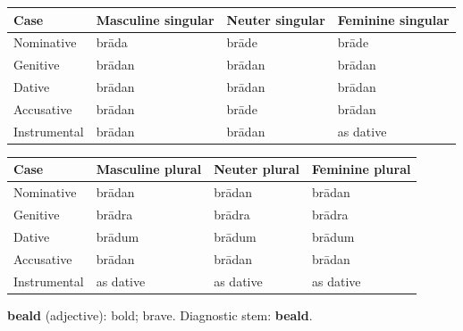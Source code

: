 \par\begingroup
\fontsize{10.5}{13.2}\selectfont
\setlength{\LTleft}{0pt}\setlength{\LTright}{\fill}
\noindent
\begin{tabular}{@{}>{\raggedright\arraybackslash}p{22.0mm}>{\raggedright\arraybackslash}p{31.188mm}>{\raggedright\arraybackslash}p{31.188mm}>{\raggedright\arraybackslash}p{31.188mm}@{}}
\toprule
\textbf{Case} & \textbf{Masculine singular} & \textbf{Neuter singular} & \textbf{Feminine singular} \\
\midrule
Nominative & brāda & brāde & brāde \\
Genitive & brādan & brādan & brādan \\
Dative & brādan & brādan & brādan \\
Accusative & brādan & brāde & brādan \\
Instrumental & brādan & brādan & as dative \\
\bottomrule
\end{tabular}
\par\endgroup
\par\addvspace{5pt}
\par\begingroup
\fontsize{10.5}{13.2}\selectfont
\setlength{\LTleft}{0pt}\setlength{\LTright}{\fill}
\noindent
\begin{tabular}{@{}>{\raggedright\arraybackslash}p{22.0mm}>{\raggedright\arraybackslash}p{31.188mm}>{\raggedright\arraybackslash}p{31.188mm}>{\raggedright\arraybackslash}p{31.188mm}@{}}
\toprule
\textbf{Case} & \textbf{Masculine plural} & \textbf{Neuter plural} & \textbf{Feminine plural} \\
\midrule
Nominative & brādan & brādan & brādan \\
Genitive & brādra & brādra & brādra \\
Dative & brādum & brādum & brādum \\
Accusative & brādan & brādan & brādan \\
Instrumental & as dative & as dative & as dative \\
\bottomrule
\end{tabular}
\par\endgroup

\textbf{beald} (adjective): bold; brave. Diagnostic stem: \textbf{beald}.

